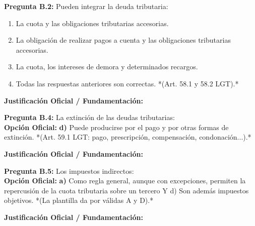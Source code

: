 \documentclass[11pt,a4paper,openany]{article}
\begin{document}
\noindent\textbf{\sffamily Pregunta B.2:} Pueden integrar la deuda tributaria:\\[0.15cm]
\begin{enumerate}[label=\textbf{\alph*)},leftmargin=1.8em,itemsep=1.5pt,topsep=2pt,partopsep=0pt,parsep=0pt]
    \item La cuota y las obligaciones tributarias accesorias.
    \item La obligación de realizar pagos a cuenta y las obligaciones tributarias accesorias.
    \item La cuota, los intereses de demora y determinados recargos.
    \item Todas las respuestas anteriores son correctas. *(Art. 58.1 y 58.2 LGT).*
\end{enumerate}
\begin{solucionBox}
\textbf{Justificación Oficial / Fundamentación:}\\[0.1cm]

\end{solucionBox}
\vspace{0.35cm}

\noindent\textbf{\sffamily Pregunta B.4:} La extinción de las deudas tributarias:\\[0.15cm]
\noindent\textbf{Opción Oficial:} \textbf{d)} Puede producirse por el pago y por otras formas de extinción. *(Art. 59.1 LGT: pago, prescripción, compensación, condonación...).*\\[0.15cm]
\begin{solucionBox}
\textbf{Justificación Oficial / Fundamentación:}\\[0.1cm]

\end{solucionBox}
\vspace{0.35cm}

\noindent\textbf{\sffamily Pregunta B.5:} Los impuestos indirectos:\\[0.15cm]
\noindent\textbf{Opción Oficial:} \textbf{a)} Como regla general, aunque con excepciones, permiten la repercusión de la cuota tributaria sobre un tercero Y  d) Son además impuestos objetivos. *(La plantilla da por válidas A y D).*\\[0.15cm]
\begin{solucionBox}
\textbf{Justificación Oficial / Fundamentación:}\\[0.1cm]

\end{solucionBox}
\vspace{0.35cm}
\end{document}
